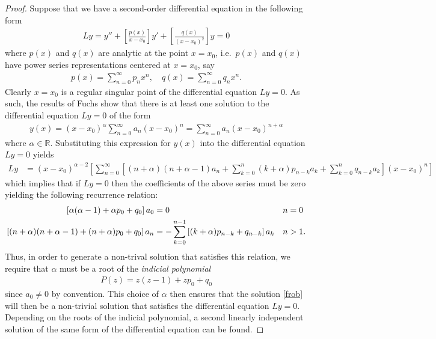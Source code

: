 \documentclass[12pt]{article}
\theoremstyle{definition}
\begin{document}
\begin{proof}
  Suppose that we have a second-order differential equation in the following
  form
  \begin{align}\label{form}
    Ly = y'' + \left[\frac{p(x)}{x-x_0}\right]y' + \left[\frac{q(x)}{(x-x_0)^2}\right]y = 0
  \end{align}
  where $p(x)$ and $q(x)$ are analytic at the point $x=x_0$, i.e.\ $p(x)$ and $q(x)$ have power series representations centered at $x=x_0$, say
  \begin{align*}
    p(x) = \sum_{n=0}^\infty p_n x^n, \quad     q(x) = \sum_{n=0}^\infty q_n x^n.
  \end{align*}
  Clearly $x=x_0$ is a regular singular point of the differential equation $Ly = 0$. As such, the results of Fuchs show that there is at least one solution to the
  differential equation $Ly = 0$ of the form
  \begin{align}\label{frob}
    y(x) = (x-x_0)^\alpha \sum_{n=0}^\infty a_n (x-x_0)^n =   \sum_{n=0}^\infty a_n (x-x_0)^{n+\alpha}
  \end{align}
  where $\alpha\in\mathbb{R}$. Substituting this expression for $y(x)$ into the differential equation $Ly=0$ yields
  \begin{align*}
    Ly &= (x-x_0)^{\alpha-2}\left[\sum_{n=0}^\infty\left[(n+\alpha)(n+\alpha-1)a_n + \sum_{k=0}^n(k+\alpha)p_{n-k}a_k + \sum_{k=0}^nq_{n-k}a_k\right](x-x_0)^n \right]
  \end{align*}
  which implies that if $Ly=0$ then the coefficients of the above series must be zero yielding the following recurrence relation:
  \begin{align}\label{rel}
    \left[\alpha(\alpha-1)+ \alpha p_{0} + q_{0}\right] a_0&= 0 &n &=0 \notag \\
    \left[(n+\alpha)(n+\alpha-1) + (n+\alpha)p_0 +q_0\right] a_n &= - \sum_{k=0}^{n-1}\left[(k+\alpha)p_{n-k} + q_{n-k}\right]a_k  &n &>1.
  \end{align}
  Thus, in order to generate a non-trival solution that satisfies this relation,
  we require that $\alpha$ must be a root of the \emph{indicial polynomial}
  \begin{align*}
    P(z) = z(z-1)+ z p_{0} + q_{0}
  \end{align*}
  since $a_0 \neq 0$ by convention.
  This choice of $\alpha$ then ensures that the solution \eqref{frob} will then be a non-trivial solution that satisfies the differential equation $Ly=0$.
  Depending on the roots of the indicial polynomial, a second linearly independent solution of the same form of the differential equation can be found.


\end{proof}
\end{document}
